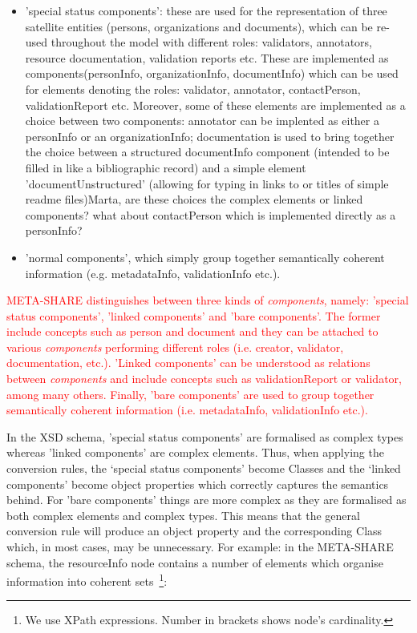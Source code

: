\documentclass{llncs}
\begin{document}
{{\begin{itemize}
\item 'special status components': these are used for the representation of three satellite entities (persons, organizations and documents), which can be re-used throughout the model with different roles: validators, annotators, resource documentation, validation reports etc. These are implemented as components(personInfo, organizationInfo, documentInfo) which can be used for elements denoting the roles: validator, annotator, contactPerson, validationReport etc. Moreover, some of these elements are implemented as a choice between two components: annotator can be implented as either a personInfo or an organizationInfo; documentation is used to bring together the choice between a structured documentInfo component (intended to be filled in like a bibliographic record) and a simple element 'documentUnstructured' (allowing for typing in links to or titles of simple readme files){Marta, are these choices the complex elements or linked components? what about contactPerson which is implemented directly as a personInfo?}
\item 'normal components', which simply group together semantically coherent information (e.g. metadataInfo, validationInfo etc.).
\end{itemize}
}
\textcolor{red}{META-SHARE distinguishes between three kinds of \emph{components}, namely: 'special status components', 'linked components' and 'bare components'. The former include concepts such as person and document and they can be attached to various \emph{components} performing different roles (i.e. creator, validator, documentation, etc.). 'Linked components' can be understood as relations between \emph{components} and include concepts such as validationReport or validator, among many others. Finally, 'bare components' are used to group together semantically coherent information (i.e. metadataInfo, validationInfo etc.).}

In the XSD schema, 'special status components' are formalised as complex types whereas 'linked components' are complex elements. Thus, when applying the conversion rules, the ‘special status components’ become Classes and the ‘linked components’ become object properties which correctly captures the semantics behind. For 'bare components' things are more complex as they are formalised as both complex elements and complex types. This means that the general conversion rule will produce an object property and the corresponding Class which, in most cases, may be unnecessary. For example: in the META-SHARE schema, the resourceInfo node contains a number of elements which organise information into coherent sets~\footnote{We use XPath expressions. Number in brackets shows node’s cardinality.}:

}
\end{document}
